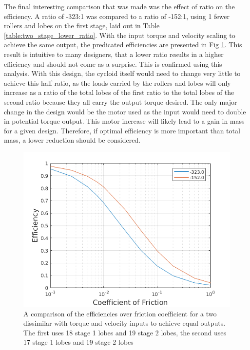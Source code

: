The final interesting comparison that was made was the effect of ratio on the efficiency. A ratio of -323:1 was compared to a ratio of -152:1, using 1 fewer rollers and lobes on the first stage, laid out in Table \ref{table:two_stage_lower_ratio}. With the input torque and velocity scaling to achieve the same output, the predicated efficiencies are presented in Fig \ref{fig:two_stage_lower_ratio}. This result is intuitive to many designers, that a lower ratio results in a higher efficiency and should not come as a surprise. This is confirmed using this analysis. With this design, the cycloid itself would need to change very little to achieve this half ratio, as the loads carried by the rollers and lobes will only increase as a ratio of the total lobes of the first ratio to the total lobes of the second ratio because they all carry the output torque desired. The only major change in the design would be the motor used as the input would need to double in potential torque output. This motor increase will likely lead to a gain in mass for a given design. Therefore, if optimal efficiency is more important than total mass, a lower reduction should be considered. 

\begin{figure}[h]
	\centering
	\includegraphics[width=0.75\linewidth]{fig/two_stage_lower_ratio}
   \caption{A comparison of the efficiencies over friction coefficient for a two dissimilar with torque and velocity inputs to achieve equal outputs. The first uses 18 stage 1 lobes and 19 stage 2 lobes, the second uses 17 stage 1 lobes and 19 stage 2 lobes}
   \label{fig:two_stage_lower_ratio}
\end{figure}
